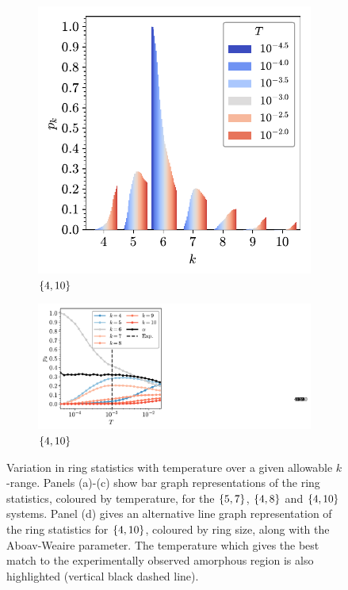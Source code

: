 \begin{figure}[bt]
	\vspace{2mm}          
     \begin{subfigure}[b]{0.45\textwidth}
         \centering
         \includegraphics[width=\textwidth]{./figures/bilayers/triraft_410.pdf}
         \caption{$\left\{4,10\right\}$}
         \label{fig:trpk3}
     \end{subfigure}
     \hfill
	\begin{subfigure}[b]{0.45\textwidth}
         \centering
         \includegraphics[width=\textwidth]{./figures/bilayers/triraft_line_410.pdf}
         \caption{$\left\{4,10\right\}$}
         \label{fig:trpk4}
     \end{subfigure}
     \hfill
   
     \caption{Variation in ring statistics with temperature over a given allowable $k$\--range. Panels (a)-(c) show bar graph representations of the ring statistics, coloured by temperature, for the $\left\{5,7\right\}$, $\left\{4,8\right\}$ and $\left\{4,10\right\}$ systems. Panel (d) gives an alternative line graph representation of the ring statistics for $\left\{4,10\right\}$, coloured by ring size, along with the Aboav\--Weaire parameter. The temperature which gives the best match to the experimentally observed amorphous region is also highlighted (vertical black dashed line).}
     \label{fig:trpk}
\end{figure}

